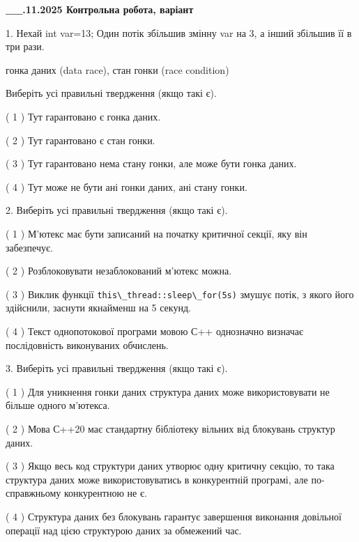 \documentclass[12pt, ukrainian]{article}
\def\code#1{\Verb!#1!}
\begin{document}
\newpage
\begin {large}

\textbf{\_\_.11.2025 Контрольна робота, варіант  }\par


{
1. Нехай int var=13; Один потік збільшив змінну var на 3, а інший збільшив її в три рази.

гонка даних (data race), стан гонки (race condition)

Виберіть усі правильні твердження (якщо такі є).\par
\vspace{2mm}
( 1 ) Тут гарантовано є гонка даних.%

( 2 ) Тут гарантовано є стан гонки.%

( 3 ) Тут гарантовано нема стану гонки, але може бути гонка даних.%

( 4 ) Тут може не бути ані гонки даних, ані стану гонки.%


2. Виберіть усі правильні твердження (якщо такі є).\par
\vspace{2mm}

( 1 ) М’ютекс має бути записаний на початку критичної секції, яку він забезпечує.%

( 2 ) Розблоковувати незаблокований м’ютекс можна.%

( 3 ) Виклик функції \code{this\_thread::sleep\_for(5s)} змушує потік, з якого його здійснили, заснути якнайменш на 5 секунд.%

( 4 ) Текст однопотокової програми мовою С++ однозначно визначає послідовність виконуваних обчислень.%


3. Виберіть усі правильні твердження (якщо такі є).\par
\vspace{2mm}

( 1 ) Для уникнення гонки даних структура даних може використовувати не більше одного м’ютекса.%

( 2 ) Мова С++20 має стандартну бібліотеку вільних від блокувань структур даних.%

( 3 ) Якщо весь код структури даних утворює одну критичну секцію, то така структура даних може використовуватись в конкурентній програмі, але по-справжньо\-му конкурентною не є.%

( 4 ) Структура даних без блокувань гарантує завершення виконання довільної операції над цією структурою даних за обмежений час.%


}
\end{large}
\end{document}

